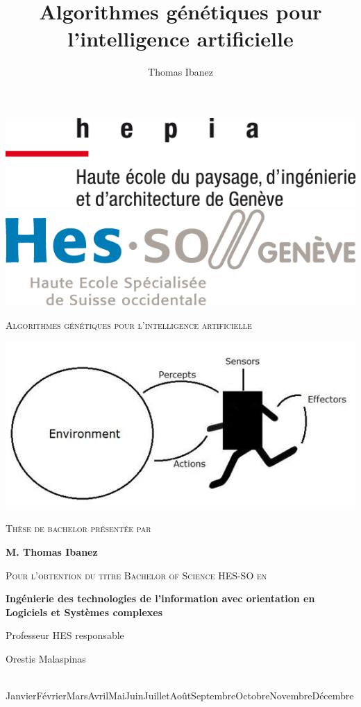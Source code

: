 \documentclass{article}
\title{Algorithmes génétiques pour l'intelligence artificielle}
\author{Thomas Ibanez}
\newcommand*{\printdate}{%
   \ifcase \month\or Janvier\or Février\or Mars\or Avril\or Mai\or Juin\or Juillet\or Août\or Septembre\or Octobre\or Novembre\or Décembre\fi \space \number\year}
\begin{document}
\begin{titlepage}
	\vspace*{-3cm}
		\includegraphics[width=.3\linewidth]{hepia.png}
		\hfill
		\includegraphics[width=.3\linewidth]{hes.png}\par
	\vspace{1cm}
	\centering
	{\scshape\huge Algorithmes génétiques pour l'intelligence artificielle \par}
	\vspace{1cm}
	\includegraphics[scale=0.4]{agent_environment.jpg}\par
	\vspace{3cm}
	{\Large\scshape Thèse de bachelor présentée par\par}
	\vspace{0.5cm}
	{\bfseries\Large M. Thomas Ibanez\par}
	\vspace{1cm}
	{\scshape\Large Pour l'obtention du titre Bachelor of Science HES-SO en\par}
	\vspace{0.5cm}
	{\bfseries\Large Ingénierie des technologies de l'information avec orientation en Logiciels et Systèmes complexes\par}
	\vfill
	Professeur HES responsable\par
	\bfseries{Orestis Malaspinas\par}

	\vfill

	{\large\ \printdate \par}
\end{titlepage}
\end{document}
